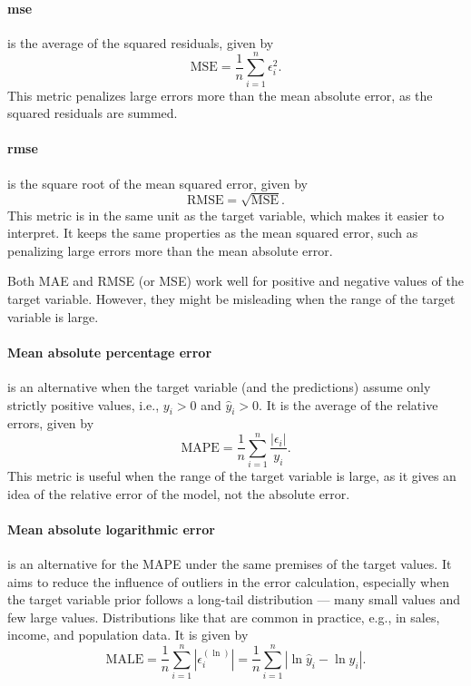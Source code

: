 \paragraph{\Gls{mse}} is the average of the squared residuals, given by
\begin{equation*}
  \text{MSE} = \frac{1}{n} \sum_{i=1}^n \epsilon_i^2\text{.}
\end{equation*}
This metric penalizes large errors more than the mean absolute error, as the squared
residuals are summed.

\paragraph{\Gls{rmse}} is the square root of the mean squared error, given by
\begin{equation*}
  \text{RMSE} = \sqrt{\text{MSE}}\text{.}
\end{equation*}
This metric is in the same unit as the target variable, which makes it easier to
interpret.  It keeps the same properties as the mean squared error, such as penalizing
large errors more than the mean absolute error.

Both MAE and RMSE (or MSE) work well for positive and negative values of the target
variable.  However, they might be misleading when the range of the target variable is
large.

\paragraph{Mean absolute percentage error} is an alternative when the target variable (and
the predictions) assume only strictly positive values, i.e., $y_i > 0$ and $\hat{y}_i > 0$.
It is the average of the relative errors, given by
\begin{equation*}
  \text{MAPE} = \frac{1}{n} \sum_{i=1}^n \frac{|\epsilon_i|}{y_i}\text{.}
\end{equation*}
This metric is useful when the range of the target variable is large, as it gives an idea
of the relative error of the \gls{model}, not the absolute error.

\paragraph{Mean absolute logarithmic error} is an alternative for the MAPE under the same
premises of the target values.  It aims to reduce the influence of outliers in the error
calculation, especially when the target variable prior follows a long-tail distribution
--- many small values and few large values.  Distributions like that are common in
practice, e.g., in sales, income, and population data.  It is given by
\begin{equation*}
  \text{MALE} = \frac{1}{n} \sum_{i=1}^n | \epsilon_i^{(\ln)} | =
    \frac{1}{n} \sum_{i=1}^n | \ln\hat{y}_i - \ln y_i |\text{.}
\end{equation*}

